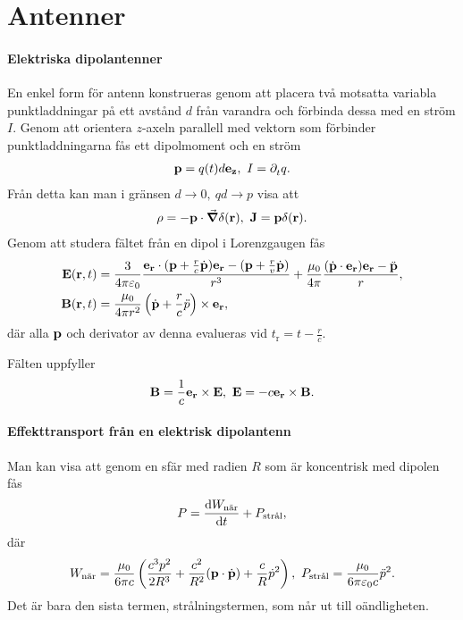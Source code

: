 \section{Antenner}

\paragraph{Elektriska dipolantenner}
En enkel form för antenn konstrueras genom att placera två motsatta variabla punktladdningar på ett avstånd $d$ från varandra och förbinda dessa med en ström $I$. Genom att orientera $z$-axeln parallell med vektorn som förbinder punktladdningarna fås ett dipolmoment och en ström
\begin{align*}
	\vb{p} = q(t)d\vb{e}_{\vb{z}},\ I = \partial_{t}^{}q.
\end{align*}
Från detta kan man i gränsen $d\to 0,\ qd\to p$ visa att
\begin{align*}
	\rho = -\vb{p}\cdot\grad{\delta(\vb{r})},\ \vb{J} = \vb{p}\delta(\vb{r}).
\end{align*}
Genom att studera fältet från en dipol i Lorenzgaugen fås
\begin{align*}
	\vb{E}(\vb{r}, t) &= \frac{3}{4\pi\varepsilon_{0}}\frac{\vb{e}_{\vb{r}}\cdot(\vb{p} + \frac{r}{c}\dot{\vb{p}})\vb{e}_{\vb{r}} - (\vb{p} + \frac{r}{v}\dot{\vb{p}})}{r^{3}} + \frac{\mu_{0}}{4\pi}\frac{(\dot{\vb{p}}\cdot\vb{e}_{\vb{r}})\vb{e}_{\vb{r}} - \ddot{\vb{p}}}{r}, \\
	\vb{B}(\vb{r}, t) &= \frac{\mu_{0}}{4\pi r^{2}}\left(\dot{\vb{p}} + \frac{r}{c}\ddot{p}\right)\times\vb{e}_{\vb{r}},
\end{align*}
där alla $\vb{p}$ och derivator av denna evalueras vid $t_{\text{r}} = t - \frac{r}{c}$.

Fälten uppfyller
\begin{align*}
	\vb{B} = \frac{1}{c}\vb{e}_{\vb{r}}\times\vb{E},\ \vb{E} = -c\vb{e}_{\vb{r}}\times\vb{B}.
\end{align*}

\paragraph{Effekttransport från en elektrisk dipolantenn}
Man kan visa att genom en sfär med radien $R$ som är koncentrisk med dipolen fås
\begin{align*}
	P = \dv{W_{\text{när}}}{t} + P_{\text{strål}},
\end{align*}
där
\begin{align*}
	W_{\text{när}} = \frac{\mu_{0}}{6\pi c}\left(\frac{c^{3}p^{2}}{2R^{3}} + \frac{c^{2}}{R^{2}}(\vb{p}\cdot\dot{\vb{p}}) + \frac{c}{R}\dot{p}^{2}\right),\ P_{\text{strål}} = \frac{\mu_{0}}{6\pi\varepsilon_{0}c}\ddot{p}^{2}.
\end{align*}
Det är bara den sista termen, strålningstermen, som når ut till oändligheten.

